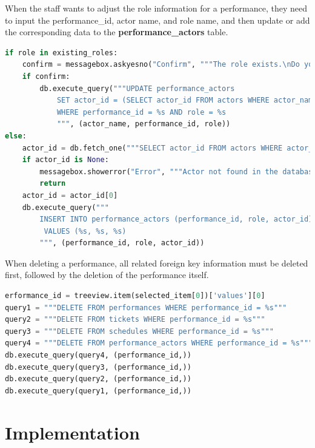 \documentclass[12pt]{article}
\begin{document}
\par When the staff wants to adjust the role information for a performance, they need to input the performance\_id, actor name, and role name, and then update or add the corresponding data to the \textbf{performance\_actors} table.
\begin{tcolorbox}[colframe=black, colback=white, boxrule=0.4mm, sharp corners=southwest, title=Excerpt of Charator Adjust Code]
    \begin{lstlisting}[language=Python, breaklines=true]
if role in existing_roles:
    confirm = messagebox.askyesno("Confirm", """The role exists.\nDo you want to replace it?""")
    if confirm:
        db.execute_query("""UPDATE performance_actors
            SET actor_id = (SELECT actor_id FROM actors WHERE actor_name = %s)
            WHERE performance_id = %s AND role = %s
            """, (actor_name, performance_id, role))
else:
    actor_id = db.fetch_one("""SELECT actor_id FROM actors WHERE actor_name = %s""", (actor_name,))
    if actor_id is None:
        messagebox.showerror("Error", """Actor not found in the database!""")
        return
    actor_id = actor_id[0]
    db.execute_query("""
        INSERT INTO performance_actors (performance_id, role, actor_id)
         VALUES (%s, %s, %s)
        """, (performance_id, role, actor_id))
\end{lstlisting}
\end{tcolorbox}

\par When deleting a performance, all related foreign key information must be deleted first, followed by the deletion of the performance itself.
\begin{tcolorbox}[colframe=black, colback=white, boxrule=0.4mm, sharp corners=southwest, title=Excerpt of Performance Delete Code]
    \begin{lstlisting}[language=Python, breaklines=true]
erformance_id = treeview.item(selected_item[0])['values'][0]
query1 = """DELETE FROM performances WHERE performance_id = %s"""
query2 = """DELETE FROM tickets WHERE performance_id = %s"""
query3 = """DELETE FROM schedules WHERE performance_id = %s"""
query4 = """DELETE FROM performance_actors WHERE performance_id = %s"""
db.execute_query(query4, (performance_id,))
db.execute_query(query3, (performance_id,))
db.execute_query(query2, (performance_id,))
db.execute_query(query1, (performance_id,))
\end{lstlisting}
\end{tcolorbox}

\section{Implementation}
\end{document}
